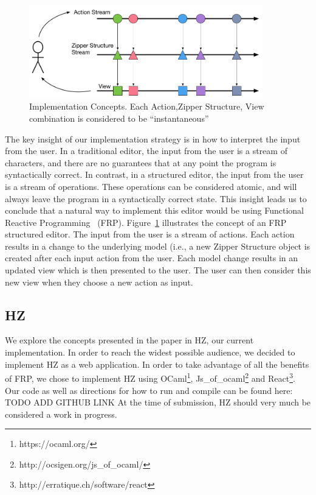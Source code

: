 \documentclass{llncs}
\begin{document}
\begin{figure}
\centering
\includegraphics[width=4in]{Implementation_Diagram}
\caption{Implementation Concepts. Each Action,Zipper Structure, View combination is considered to be ``instantaneous''}
\label{fig:FRP}
\end{figure}

The key insight of our implementation strategy is in how to interpret the input from the user.
In a traditional editor, the input from the user is a stream of characters, and there are no guarantees that at any point the program is syntactically correct.
In contrast, in a structured editor, the input from the user is a stream of operations.  These operations can be considered atomic, and will always leave the program in a syntactically correct state.
This insight leads us to conclude that a natural way to implement this editor would be using Functional Reactive Programming~\cite{Wan:2000:FRP:349299.349331} (FRP).
Figure~\ref{fig:FRP} illustrates the concept of an FRP structured editor.
The input from the user is a stream of actions.  Each action results in a change to the underlying model (i.e., a new Zipper Structure object is created after each input action from the user.
Each model change results in an updated view which is then presented to the user.  The user can then consider this new view when they choose a new action as input.

\subsection{HZ}
We explore the concepts presented in the paper in HZ, our current implementation.
In order to reach the widest possible audience, we decided to implement HZ as a web application.
In order to take advantage of all the benefits of FRP, we chose to implement HZ using OCaml\footnote{https://ocaml.org/}, Js\_of\_ocaml\footnote{http://ocsigen.org/js\_of\_ocaml/} and React\footnote{http://erratique.ch/software/react}.
Our code as well as directions for how to run and compile can be found here: TODO ADD GITHUB LINK
At the time of submission, HZ should very much be considered a work in progress.
\end{document}
